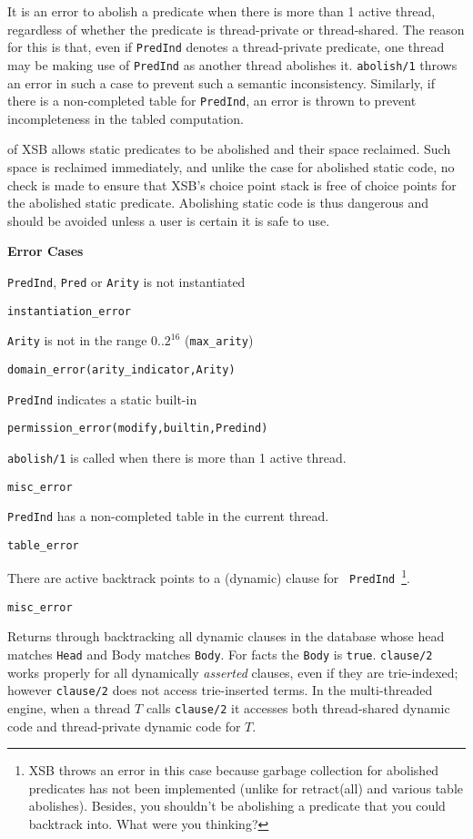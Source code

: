 \begin{description}
It is an error to abolish a predicate when there is more than 1 active
thread, regardless of whether the predicate is thread-private or
thread-shared.  The reason for this is that, even if {\tt PredInd}
denotes a thread-private predicate, one thread may be making use of
{\tt PredInd} as another thread abolishes it.  {\tt abolish/1} throws
an error in such a case to prevent such a semantic inconsistency.
Similarly, if there is a non-completed table for {\tt PredInd}, an
error is thrown to prevent incompleteness in the tabled computation.

\compatibility \version{} of XSB allows static predicates to be
abolished and their space reclaimed.  Such space is reclaimed
immediately, and unlike the case for abolished static code,  no check
is made to ensure that XSB's choice point stack is free of choice
points for the abolished static predicate.  Abolishing static code is
thus dangerous and should be avoided unless a user is certain it is
safe to use.

{\bf Error Cases}
\bi
\item 	{\tt PredInd}, {\tt Pred} or {\tt Arity} is not instantiated
\bi
\item 	{\tt instantiation\_error}
\ei
%
\item 	{\tt Arity} is not in the range 0..$2^{16}$ ({\tt max\_arity})
\bi
\item 	{\tt domain\_error(arity\_indicator,Arity)}
\ei
%
\item 	{\tt PredInd} indicates a static built-in
\bi
\item 	{\tt permission\_error(modify,builtin,Predind)}
\ei
%
\item {\tt abolish/1} is called when there is more than 1 active thread.
\bi
\item {\tt misc\_error}
\ei
%
\item {\tt PredInd} has a non-completed table in the current thread.
\bi
\item {\tt table\_error}
\ei
%
\item There are active backtrack points to a (dynamic) clause for {\tt
  PredInd}~\footnote{XSB throws an error in this case because garbage
  collection for abolished predicates has not been implemented
  (unlike for retract(all) and various table abolishes).  Besides, you
  shouldn't be abolishing a predicate that you could backtrack into.
  What were you thinking?}. 
\bi
\item {\tt misc\_error}
\ei
%
\ei

%
Returns through backtracking all dynamic clauses in the database whose
head matches {\tt Head} and Body matches {\tt Body}.  For facts the
{\tt Body} is {\tt true}.  {\tt clause/2} works properly for all
dynamically {\em asserted} clauses, even if they are trie-indexed;
however {\tt clause/2} does not access trie-inserted terms.  In the
multi-threaded engine, when a thread $T$ calls {\tt clause/2} it
accesses both thread-shared dynamic code and thread-private dynamic
code for $T$.


\end{description}
